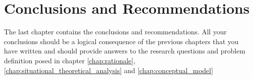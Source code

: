 \chapter{Conclusions and Recommendations}\label{cap:conclusions_recommendations}

The last chapter contains the conclusions and recommendations. All your conclusions should be a logical consequence of the previous chapters that you have written and should provide answers to the research questions and problem definition posed in chapter \ref{chap:rationale}, \ref{chap:situational_theoretical_analysis} and \ref{chap:conceptual_model} 


